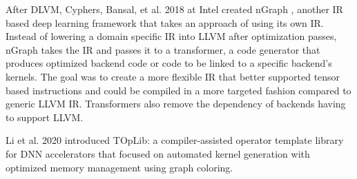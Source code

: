 After DLVM, Cyphers, Bansal, et al. 2018 at Intel created nGraph \cite{nGraph},
another IR based deep learning framework that takes an approach of using its
own IR. Instead of lowering a domain specific IR into LLVM after optimization
passes, nGraph takes the IR and passes it to a transformer, a code generator
that produces optimized backend code or code to be linked to a specific
backend's kernels. The goal was to create a more flexible IR that better supported
tensor based instructions and could be compiled in a more targeted fashion compared
to generic LLVM IR. Transformers also remove the dependency of backends having
to support LLVM.


Li et al. 2020 introduced TOpLib: a compiler-assisted operator template library
for DNN accelerators that focused on automated kernel generation with optimized
memory management using graph coloring.


